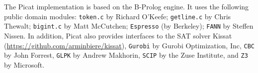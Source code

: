 \documentclass[11pt]{report}
\newcommand{\ignore}[1]{}
\begin{document}
The Picat implementation is based on the B-Prolog engine. It uses the following public domain modules: \ignore{\texttt{prism} by Taisuke Sato and Yoshitaka Kameya; }\texttt{token.c} by Richard O'Keefe; \texttt{getline.c} by Chris Thewalt; \texttt{bigint.c} by Matt McCutchen; \texttt{Espresso} (by Berkeley); \texttt{FANN} by Steffen Nissen. In addition, Picat also provides interfaces to the SAT solver Kissat (\url{https://github.com/arminbiere/kissat}), \texttt{Gurobi} by Gurobi Optimization, Inc, \texttt{CBC} by John Forrest, \texttt{GLPK} by Andrew Makhorin, \texttt{SCIP} by the Zuse Institute, and \texttt{Z3} by Microsoft.

\tableofcontents

\cleardoublepage
\pagestyle{plain}
\setcounter{page}{1}

























\begin{adjustwidth}{-2cm}{-1cm}

\end{adjustwidth}
\clearpage
{}
{}
\printindex
\end{document}
